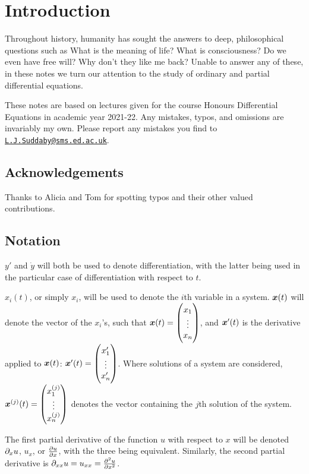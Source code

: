 \section*{Introduction}

Throughout history, humanity has sought the answers to deep, philosophical questions such as What is the meaning of life? What is consciousness? Do we even have free will? Why don't they like me back? Unable to answer any of these, in these notes we turn our attention to the study of ordinary and partial differential equations.

These notes are based on lectures given for the course Honours Differential Equations in academic year 2021-22. Any mistakes, typos, and omissions are invariably my own. Please report any mistakes you find to \texttt{\href{mailto:L.J.Suddaby@sms.ed.ac.uk}{L.J.Suddaby@sms.ed.ac.uk}}.

\subsection*{Acknowledgements}

Thanks to Alicia and Tom for spotting typos and their other valued contributions.

\subsection*{Notation}

$y'$ and $\dot{y}$ will both be used to denote differentiation, with the latter being used in the particular case of differentiation with respect to $t$.

$x_i(t)$, or simply $x_i$, will be used to denote the $i$th variable in a system. $\bm{x}(t)$ will denote the vector of the $x_i$'s, such that $\bm{x}(t) = \begin{pmatrix}x_1 \\ \vdots \\ x_n\end{pmatrix}$, and $\bm{x}'(t)$ is the derivative applied to $\bm{x}(t)$: $\bm{x}'(t) = \begin{pmatrix}x_1' \\ \vdots \\ x_n'\end{pmatrix}$. Where solutions of a system are considered, $\bm{x}^{(j)}(t) = \begin{pmatrix}x_1^{(j)} \\ \vdots \\ x_n^{(j)}\end{pmatrix}$ denotes the vector containing the $j$th solution of the system.

The first partial derivative of the function $u$ with respect to $x$ will be denoted $\partial_x u$, $u_x$, or $\frac{\partial u}{\partial x}$, with the three being equivalent. Similarly, the second partial derivative is $\partial_{xx}u = u_{xx} = \frac{\partial^2 u}{\partial x^2}$.